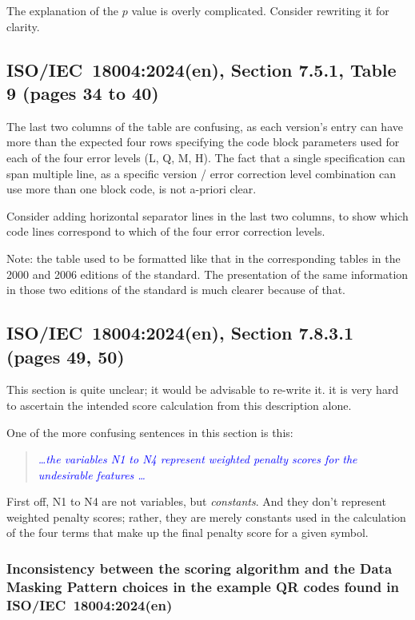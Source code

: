\documentclass[a4paper,twoside]{article}
\newcommand{\shortstandard}{ISO/IEC~18004}
\newcommand{\standard}{\shortstandard:2024(en)}
\newcommand{\quotestandard}[1]{\textcolor{blue}{\textit{#1}}}
\newcommand{\ddd}{\dots}
\begin{document}
The explanation of the $p$ value is overly complicated. Consider rewriting it for clarity.

\subsection{\standard, Section 7.5.1, Table 9 (pages 34 to 40)}

The last two columns of the table are confusing, as each version's entry can have more than the expected
four rows specifying the code block parameters used for each of the four error levels (L, Q, M, H). The
fact that a single specification can span multiple line, as a specific version / error correction level
combination can use more than one block code, is not a-priori clear.

Consider adding horizontal separator lines in the last two columns, to show
which code lines correspond to which of the four error correction levels.

Note: the table used to be formatted like that in the corresponding tables in the 2000
and 2006 editions of the standard. The presentation of the same information in those two
editions of the standard is much clearer because of that.

\subsection{\standard, Section 7.8.3.1 (pages 49, 50)}
\label{sec:dmp-scoring}

This section is quite unclear; it would be advisable to re-write it. it is very
hard to ascertain the intended score calculation from this description alone. 

One of the more confusing sentences in this section is this:

\begin{quote}
\quotestandard{\ddd the variables N1 to N4 represent weighted penalty scores for the undesirable features \ddd}
\end{quote}

First off, N1 to N4 are not variables, but \emph{constants}. And they don't represent weighted penalty
scores; rather, they are merely constants used in the calculation of the four terms that make up
the final penalty score for a given symbol.

\subsubsection*{Inconsistency between the scoring algorithm and the Data Masking Pattern choices in the example QR codes found in \standard}
\end{document}
